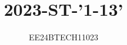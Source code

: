\documentclass[journal,12pt,onecolumn]{IEEEtran}
\theoremstyle{remark}
\begin{document}

\vspace{3cm}


\title{2023-ST-'1-13'}
\author{EE24BTECH11023}
\maketitle




{\let\newpage\relax\maketitle}

\renewcommand{\thefigure}{\theenumi}
\renewcommand{\thetable}{\theenumi}
\setlength{\intextsep}{10pt} %


\renewcommand{\thetable}{\theenumi}
\end{document}
